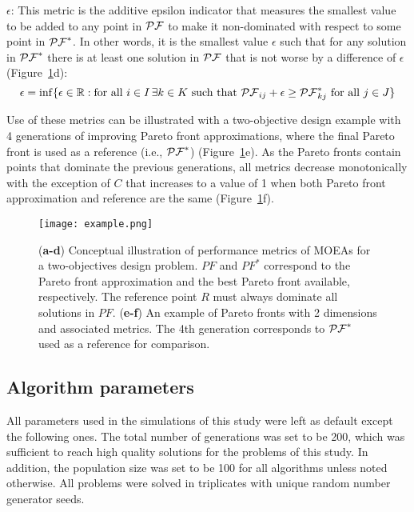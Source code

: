 {$\epsilon$: This metric is the additive epsilon indicator \cite{zitzler2002} that measures the smallest value to be added to any point in $\mathcal{PF}$ to make it non-dominated with respect to some point in  $\mathcal{PF}^*$. In other words, it is the smallest value $\epsilon$ such that for any solution in $\mathcal{PF}^*$ there is at least one solution in $\mathcal{PF}$ that is not worse by a difference of $\epsilon$ (Figure~\ref{fig4:example}d):
\begin{equation}
	\epsilon = \inf\{\epsilon \in \mathbb{R} : \textrm{for all }i \in I \, \exists k \in K \textrm{ such that } \mathcal{PF}_{ij} + \epsilon \ge \mathcal{PF}^*_{kj} \textrm{ for all } j \in J\}
\end{equation}

Use of these metrics can be illustrated with a two-objective design example with 4 generations of improving Pareto front approximations, where the final Pareto front is used as a reference (i.e., $\mathcal{PF}^*$) (Figure~\ref{fig4:example}e). As the Pareto fronts contain points that dominate the previous generations, all metrics decrease monotonically with the exception of $C$ that increases to a value of 1 when both Pareto front approximation and reference are the same (Figure~\ref{fig4:example}f).

\begin{figure}[h]
\centering
\texttt{[image: example.png]}
    \caption[Conceptual illustration of performance metrics]{(\textbf{a-d}) Conceptual illustration of performance metrics of MOEAs for a two-objectives design problem. $PF$ and $PF^*$ correspond to the Pareto front approximation and the best Pareto front available, respectively. The reference point $R$ must always dominate all solutions in $PF$. (\textbf{e-f}) An example of Pareto fronts with 2 dimensions and associated metrics. The 4th generation corresponds to $\mathcal{PF}^*$ used as a reference for comparison.}
\label{fig4:example}
\end{figure}

\subsection{Algorithm parameters}
All parameters used in the simulations of this study were left as default except the following ones. The total number of generations was set to be 200, which was sufficient to reach high quality solutions for the problems of this study. In addition, the population size was set to be 100 for all algorithms unless noted otherwise.  All problems were solved in triplicates with unique random number generator seeds.

}
